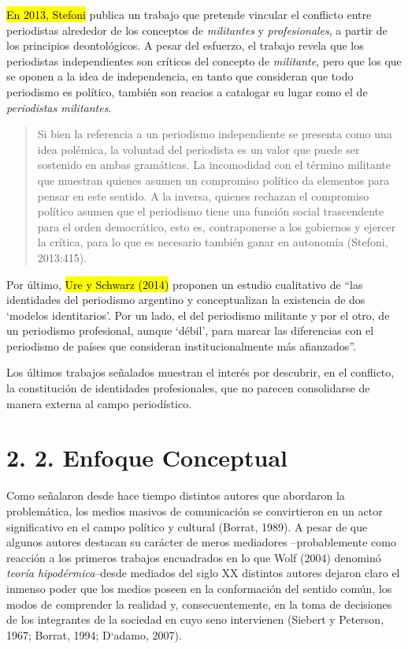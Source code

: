 \hl{En 2013, Stefoni} publica un trabajo que pretende vincular el conflicto entre periodistas alrededor de los conceptos de \emph{militantes} y \emph{profesionales}, a partir de los principios deontológicos. A pesar del esfuerzo, el trabajo revela que los periodistas independientes son críticos del concepto de \emph{militante}, pero que los que se oponen a la idea de independencia, en tanto que consideran que todo periodismo es político, también son reacios a catalogar su lugar como el de \emph{periodistas militantes}.

\begin{quote}
Si bien la referencia a un periodismo independiente se presenta como una idea polémica, la voluntad del periodista es un valor que puede ser sostenido en ambas gramáticas. La incomodidad con el término militante que muestran quienes asumen un compromiso político da elementos para pensar en este sentido. A la inversa, quienes rechazan el compromiso político asumen que el periodismo tiene una función social trascendente para el orden democrático, esto es, contraponerse a los gobiernos y ejercer la crítica, para lo que es necesario también ganar en autonomía (Stefoni, 2013:415).
\end{quote}

Por último, \hl{Ure y Schwarz (2014)} proponen un estudio cualitativo de \enquote{las identidades del periodismo argentino y conceptualizan la existencia de dos \enquote{modelos identitarios}. Por un lado, el del periodismo militante y por el otro, de un periodismo profesional, aunque \enquote{débil}, para marcar las diferencias con el periodismo de países que consideran institucionalmente más afianzados}.

Los últimos trabajos señalados muestran el interés por descubrir, en el conflicto, la constitución de identidades profesionales, que no parecen consolidarse de manera externa al campo periodístico.

\section{2. 2. Enfoque Conceptual}

Como señalaron desde hace tiempo distintos autores que abordaron la problemática, los medios masivos de comunicación se convirtieron en un actor significativo en el campo político y cultural (Borrat, 1989). A pesar de que algunos autores destacan su carácter de meros mediadores --probablemente como reacción a los primeros trabajos encuadrados en lo que Wolf (2004) denominó \emph{teoría hipodérmica}--desde mediados del siglo XX distintos autores dejaron claro el inmenso poder que los medios poseen en la conformación del sentido común, los modos de comprender la realidad y, consecuentemente, en la toma de decisiones de los integrantes de la sociedad en cuyo seno intervienen (Siebert y Peterson, 1967; Borrat, 1994; D`adamo, 2007).


